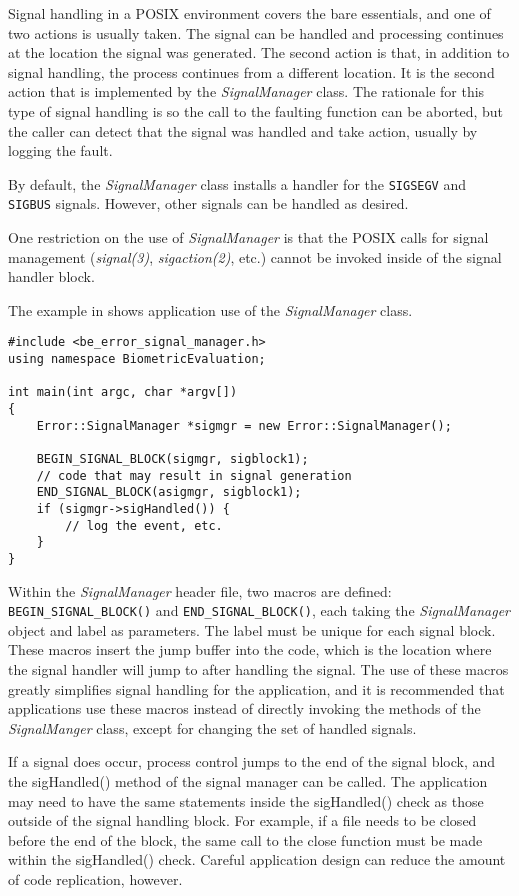 Signal handling in a POSIX environment covers the bare essentials, and one of
two actions is usually taken. The signal can be handled and processing
continues at the location the signal was generated. The second action is
that, in addition to signal handling, the process continues from a different
location. It is the second action that is implemented by the
{\em SignalManager} class. The rationale for this type of signal handling is
so the call to the faulting function can be aborted, but the caller can
detect that the signal was handled and take action, usually by logging the
fault.

By default, the {\em SignalManager} class installs a handler for the
{\tt SIGSEGV} and {\tt SIGBUS} signals. However, other signals can be
handled as desired.

One restriction on the use of {\em SignalManager} is that the POSIX calls for
signal management ({\em signal(3)}, {\em sigaction(2)}, etc.) cannot be
invoked inside of the signal handler block.

The example in  shows application use of the
{\em SignalManager} class.

\begin{lstlisting}[caption={Using the SignalManger}, label=signalmanageruse]
#include <be_error_signal_manager.h>
using namespace BiometricEvaluation;

int main(int argc, char *argv[])
{
	Error::SignalManager *sigmgr = new Error::SignalManager();

	BEGIN_SIGNAL_BLOCK(sigmgr, sigblock1);
	// code that may result in signal generation
	END_SIGNAL_BLOCK(asigmgr, sigblock1);
	if (sigmgr->sigHandled()) {
		// log the event, etc.
	}
}
\end{lstlisting}

Within the {\em SignalManager} header file, two macros are defined:
{\tt BEGIN\_SIGNAL\_BLOCK()} and {\tt END\_SIGNAL\_BLOCK()}, each taking the
{\em SignalManager} object and label as parameters. The label must be unique
for each signal block. These macros insert the
jump buffer into the code, which is the location where the signal handler will
jump to after handling the signal. The use of these macros greatly simplifies
signal handling for the application, and it is recommended that applications
use these macros instead of directly invoking the methods of the
{\em SignalManger} class, except for changing the set of handled signals.

If a signal does occur, process control jumps to the end of the signal block,
and the sigHandled() method of the signal manager can be called. The
application may need to have the same statements inside the sigHandled() check
as those outside of the signal handling block. For example, if a file needs
to be closed before the end of the block, the same call to the close function
must be made within the sigHandled() check. Careful application design can
reduce the amount of code replication, however.

